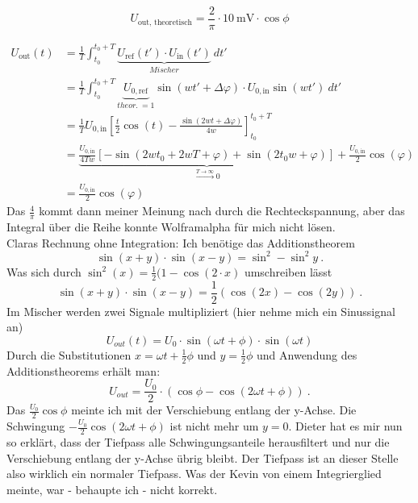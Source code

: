 \[U_\text{out, theoretisch} = \frac{2}{\pi}\cdot\SI{10}{\milli\volt}\cdot \cos\phi\]

\begin{align}
	U_\text{out}(t) &= \frac{1}{T}\int_{t_0}^{t_0+T}\underbrace{U_\text{ref}(t')\cdot U_\text{in}(t')}_{Mischer}\ dt' \\
	&= \frac{1}{T}\int_{t_0}^{t_0+T}\underbrace{U_{0,\text{ref}}}_{theor.\ = 1}\sin(wt'+\Delta\varphi)\cdot U_{0,\text{in}}\sin(wt')\ dt' \\
	&= \frac{1}{T}U_{0,\text{in}}\left[\frac{t}{2}\cos(t)-\frac{\sin(2wt+\Delta\varphi)}{4w}\right]_{t_0}^{t_0+T} \\
	&= \underbrace{\frac{U_{0,\text{in}}}{4Tw}\left[-\sin(2wt_0+2wT+\varphi)+\sin(2t_0w+\varphi)\right]}_{\overset{T\rightarrow\infty}{\longrightarrow} 0}+\frac{U_{0,\text{in}}}{2}\cos(\varphi) \\
	&= \frac{U_{0,\text{in}}}{2}\cos(\varphi)
\end{align}
Das $\frac{4}{\pi}$ kommt dann meiner Meinung nach durch die Rechteckspannung, aber das Integral über die Reihe konnte Wolframalpha für mich nicht lösen. \\
Claras Rechnung ohne Integration:
Ich benötige das Additionstheorem
\begin{equation}
	\sin(x+y) \cdot \sin(x-y)  = \sin^2 - \sin^2 y \ .
\end{equation}
Was sich durch $\sin^2(x) = \frac{1}{2}(1-\cos(2\cdot x)$ umschreiben lässt
\begin{equation}
\sin(x+y) \cdot \sin(x-y)  = \frac{1}{2} \left(\cos(2x)-\cos(2y) \right) \ .
\end{equation}
Im Mischer werden zwei Signale multipliziert (hier nehme mich ein Sinussignal an)
\begin{equation}
U_{out}(t)=U_0 \cdot \sin(\omega t + \phi) \cdot \sin(\omega t)
\end{equation}
Durch die Substitutionen $x= \omega t + \frac{1}{2} \phi$ und $y=\frac{1}{2} \phi$ und Anwendung des Additionstheorems erhält man:
\begin{equation}
U_{out}=\frac{U_0}{2}\cdot(\cos{\phi}-\cos{(2\omega t + \phi)}) \ .
\end{equation}
Das $\frac{U_0}{2}\cos \phi$ meinte ich mit der Verschiebung entlang der y-Achse. Die Schwingung $-\frac{U_0}{2}\cos{(2\omega t + \phi)}$ ist nicht mehr um $y=0$. Dieter hat es mir nun so erklärt, dass der Tiefpass alle Schwingungsanteile herausfiltert und nur die Verschiebung entlang der y-Achse übrig bleibt. Der Tiefpass ist an dieser Stelle also wirklich ein normaler Tiefpass. Was der Kevin von einem Integrierglied meinte, war - behaupte ich - nicht korrekt.
	